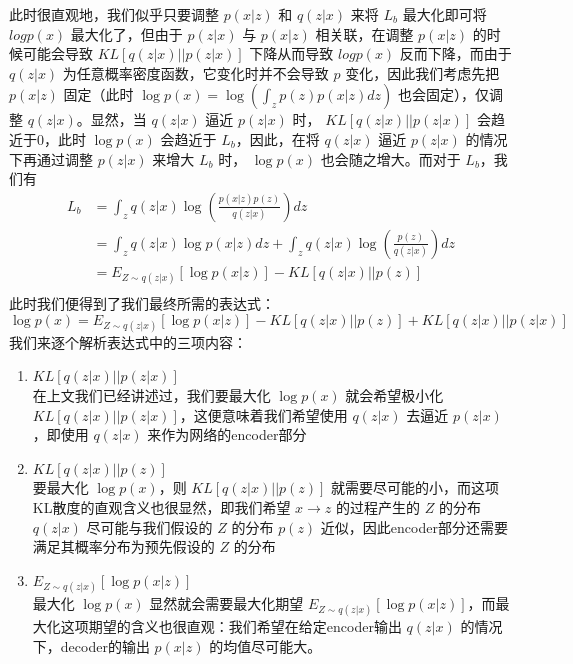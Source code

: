 \documentclass[12pt,a4paper,UTF8]{article}
\begin{document}
此时很直观地，我们似乎只要调整 $p\left(x|z\right)$ 和 $q\left(z|x\right)$ 来将 $L_b$ 最大化即可将 $log p\left(x\right)$ 最大化了，但由于 $p\left(z|x\right)$ 与 $p\left(x|z\right)$ 相关联，在调整 $p\left(x|z\right)$ 的时候可能会导致 $KL\left[q\left(z|x\right)||p\left(z|x\right)\right]$ 下降从而导致 $log p\left(x\right)$ 反而下降，而由于 $q\left(z|x\right)$ 为任意概率密度函数，它变化时并不会导致 $p$ 变化，因此我们考虑先把 $p\left(x|z\right)$ 固定（此时 $\log p\left(x\right)=\log\left(\int_zp\left(z\right)p\left(x|z\right)dz\right)$ 也会固定），仅调整 $q\left(z|x\right)$。显然，当 $q\left(z|x\right)$ 逼近 $p\left(z|x\right)$ 时， $KL\left[q\left(z|x\right)||p\left(z|x\right)\right]$ 会趋近于0，此时 $\log p\left(x\right)$ 会趋近于 $L_b$，因此，在将 $q\left(z|x\right)$ 逼近 $p\left(z|x\right)$ 的情况下再通过调整 $p\left(z|x\right)$ 来增大 $L_b$ 时， $\log p\left(x\right)$ 也会随之增大。而对于 $L_b$，我们有
\[\begin{aligned}
L_b&=\int_zq\left(z|x\right)\log\left(\frac{p\left(x|z\right)p\left(z\right)}{q\left(z|x\right)}\right)dz\\
&=\int_zq\left(z|x\right)\log p\left(x|z\right)dz+\int_zq\left(z|x\right)\log\left(\frac{p\left(z\right)}{q\left(z|x\right)}\right)dz\\
&=E_{Z\sim q\left(z|x\right)}\left[\log p\left(x|z\right)\right]-KL\left[q\left(z|x\right)||p\left(z\right)\right]\\
\end{aligned}\]
此时我们便得到了我们最终所需的表达式：
\[\log p\left(x\right)=E_{Z\sim q\left(z|x\right)}\left[\log p\left(x|z\right)\right]-KL\left[q\left(z|x\right)||p\left(z\right)\right]+KL\left[q\left(z|x\right)||p\left(z|x\right)\right]\]
我们来逐个解析表达式中的三项内容：

\begin{enumerate}
\item $KL\left[q\left(z|x\right)||p\left(z|x\right)\right]$\\
在上文我们已经讲述过，我们要最大化 $\log p\left(x\right)$ 就会希望极小化 $KL\left[q\left(z|x\right)||p\left(z|x\right)\right]$，这便意味着我们希望使用 $q\left(z|x\right)$ 去逼近 $p\left(z|x\right)$，即使用 $q\left(z|x\right)$ 来作为网络的encoder部分
\item $KL\left[q\left(z|x\right)||p\left(z\right)\right]$\\
要最大化 $\log p\left(x\right)$，则 $KL\left[q\left(z|x\right)||p\left(z\right)\right]$ 就需要尽可能的小，而这项KL散度的直观含义也很显然，即我们希望 $x\to z$ 的过程产生的 $Z$ 的分布 $q\left(z|x\right)$ 尽可能与我们假设的 $Z$ 的分布 $p\left(z\right)$ 近似，因此encoder部分还需要满足其概率分布为预先假设的 $Z$ 的分布
\item $E_{Z\sim q\left(z|x\right)}\left[\log p\left(x|z\right)\right]$\\
最大化 $\log p\left(x\right)$ 显然就会需要最大化期望 $E_{Z\sim q\left(z|x\right)}\left[\log p\left(x|z\right)\right]$，而最大化这项期望的含义也很直观：我们希望在给定encoder输出 $q\left(z|x\right)$ 的情况下，decoder的输出 $p\left(x|z\right)$ 的均值尽可能大。
\end{enumerate}
\end{document}
